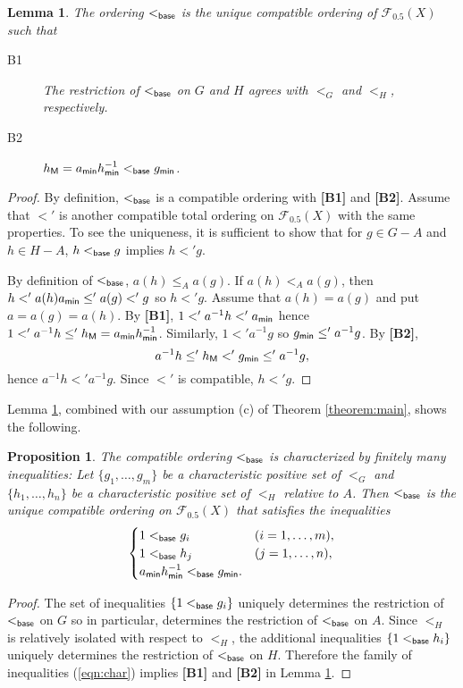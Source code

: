 \documentclass[10pt]{amsart}
\newtheorem{proposition}[theorem]{Proposition}
\newtheorem{lemma}[theorem]{Lemma}
\numberwithin{equation}{section}
\begin{document}
\begin{lemma}
\label{lemma:base}
The ordering $<_{\sf base}$ is the unique compatible ordering of ${\mathcal{F}}_{0.5}(X)$ such that
\begin{description}
\item[B1] The restriction of $<_{\sf base}$ on $G$ and $H$ agrees with $<_{G}$ and $<_{H}$, respectively.
\item[B2] $h_{\sf M}=a_{\sf min}h_{\sf min}^{-1} <_{\sf base} g_{\sf min}$.
\end{description}
\end{lemma}
\begin{proof}
By definition, $<_{\sf base}$ is a compatible ordering with {\bf [B1]} and {\bf [B2]}.
Assume that $<'$ is another compatible total ordering on ${\mathcal{F}}_{0.5}(X)$ with the same properties. To see the uniqueness, it is sufficient to show that for $g \in G-A$ and $h \in H-A$, $h<_{\sf base} g$ implies $h <' g$.

By definition of $<_{\sf base}$, $a(h) \leq_{A} a(g)$. If $a(h) <_{A} a(g)$, then $h <' a(h) a_{\sf min} \leq' a(g) <' g$ so $h<'g$. Assume that $a(h)=a(g)$ and put $a=a(g)=a(h)$. By {\bf [B1]}, $1 <' a^{-1}h <' a_{\sf min}$ hence $1 <' a^{-1} h \leq' h_{\sf M} = a_{\sf min}h_{\sf min}^{-1}$.
Similarly, $1 <' a^{-1}g$ so $g_{\sf min} \leq' a^{-1}g$.
By {\bf [B2]},
\[ a^{-1} h \leq' h_{\sf M}<' g_{\sf min} \leq' a^{-1}g, \]
 hence $ a^{-1} h <' a^{-1} g $. Since $<'$ is compatible, $h <' g$.
\end{proof}

Lemma \ref{lemma:base}, combined with our assumption (c) of Theorem \ref{theorem:main}, shows the following.

\begin{proposition}
\label{prop:charbase}
The compatible ordering $<_{\sf base}$ is characterized by finitely many inequalities: Let $\{g_{1},\ldots,g_m\}$ be a characteristic positive set of $<_{G}$ and $\{h_{1},\ldots,h_n\}$ be a characteristic positive set of $<_{H}$ relative to $A$. Then $<_{\sf base}$ is the unique compatible ordering on ${\mathcal{F}}_{0.5}(X)$ that satisfies the inequalities
\begin{gather}
\label{eqn:char}
\begin{cases}
1<_{\sf base} g_{i} & (i=1,\ldots,m),\\
1 <_{\sf base} h_{j} & (j=1,\ldots,n), \\
a_{\sf min}h_{\sf min}^{-1} <_{\sf base} g_{\sf min}. 
\end{cases}
\end{gather}
\end{proposition}
\begin{proof}
The set of inequalities $\{1<_{\sf base} g_{i}\}$ uniquely determines the restriction of $<_{\sf base}$ on $G$ so in particular, determines the restriction of $<_{\sf base}$ on $A$. Since $<_{H}$ is relatively isolated with respect to $<_{H}$, the additional inequalities $\{1<_{\sf base} h_{i}\}$ uniquely determines the restriction of $<_{\sf base}$ on $H$. Therefore the family of inequalities (\ref{eqn:char}) implies {\bf [B1]} and {\bf [B2]} in Lemma \ref{lemma:base}.
\end{proof}
\end{document}
